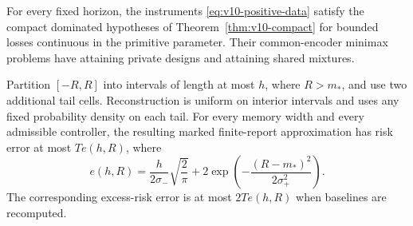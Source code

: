 \begin{theorem}\label{thm:v10-hmm}
For every fixed horizon, the instruments
\eqref{eq:v10-positive-data} satisfy the compact dominated hypotheses
of Theorem~\ref{thm:v10-compact} for bounded losses continuous in the
primitive parameter. Their common-encoder minimax problems have
attaining private designs and attaining shared mixtures.

Partition $[-R,R]$ into intervals of length at most $h$, where $R>m_*$,
and use two additional tail cells. Reconstruction is uniform on
interior intervals and uses any fixed probability density on each
tail. For every memory width and every admissible controller, the
resulting marked finite-report approximation has risk error at most
$T e(h,R)$, where
\begin{equation}\label{eq:v10-bin-error}
 e(h,R)=\frac{h}{2\sigma_-}\sqrt{\frac2\pi}
       +2\exp\left(-\frac{(R-m_*)^2}{2\sigma_+^2}\right).
\end{equation}
The corresponding excess-risk error is at most $2T e(h,R)$ when
baselines are recomputed.
\end{theorem}
